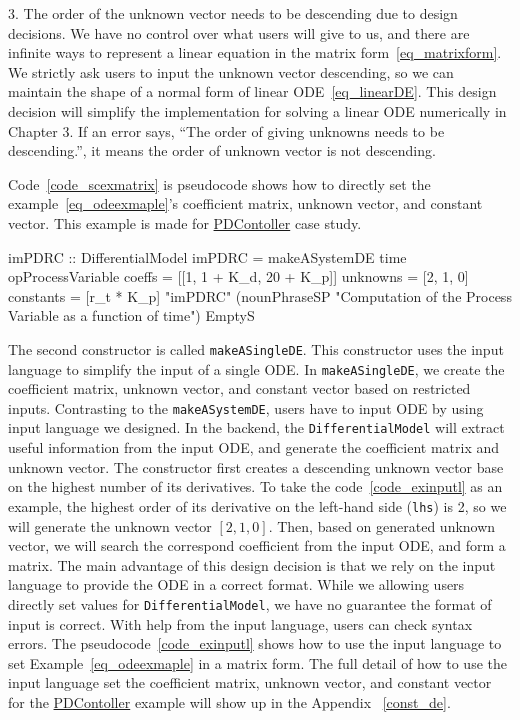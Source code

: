 3. The order of the unknown vector needs to be descending due to design decisions. We have no control over what users will give to us, and there are infinite ways to represent a linear equation in the matrix form~\ref{eq_matrixform}. We strictly ask users to input the unknown vector descending, so we can maintain the shape of a normal form of linear ODE~\ref{eq_linearDE}. This design decision will simplify the implementation for solving a linear ODE numerically in Chapter 3. If an error says, ``The order of giving unknowns needs to be descending.'', it means the order of unknown vector is not descending.

Code~\ref{code_scexmatrix} is pseudocode shows how to directly set the example~\ref{eq_odeexmaple}'s coefficient matrix, unknown vector, and constant vector. This example is made for \href{https://jacquescarette.github.io/Drasil/examples/pdcontroller/SRS/srs/PDController_SRS.html}{PDContoller} case study.

\begin{listing}[ht]
\begin{haskell1}
imPDRC :: DifferentialModel
imPDRC = makeASystemDE
	time
	opProcessVariable
	coeffs = [[1, 1 + K_d, 20 + K_p]]
	unknowns = [2, 1, 0]
	constants = [r_t * K_p]
	"imPDRC"
	(nounPhraseSP "Computation of the Process Variable as a function of time")
	EmptyS
\end{haskell1}
\label{code_scexmatrix}
\end{listing}

The second constructor is called \verb|makeASingleDE|. This constructor uses the input language to simplify the input of a single ODE. In \verb|makeASingleDE|, we create the coefficient matrix, unknown vector, and constant vector based on restricted inputs. Contrasting to the \verb|makeASystemDE|, users have to input ODE by using input language we designed. In the backend, the \verb|DifferentialModel| will extract useful information from the input ODE, and generate the coefficient matrix and unknown vector. The constructor first creates a descending unknown vector base on the highest number of its derivatives. To take the code~\ref{code_exinputl} as an example, the highest order of its derivative on the left-hand side (\verb|lhs|) is 2, so we will generate the unknown vector $[2, 1, 0]$. Then, based on generated unknown vector, we will search the correspond coefficient from the input ODE, and form a matrix. The main advantage of this design decision is that we rely on the input language to provide the ODE in a correct format. While we allowing users directly set values for \verb|DifferentialModel|, we have no guarantee the format of input is correct. With help from the input language, users can check syntax errors. The pseudocode~\ref{code_exinputl} shows how to use the input language to set Example~\ref{eq_odeexmaple} in a matrix form. The full detail of how to use the input language set the coefficient matrix, unknown vector, and constant vector for the \href{https://jacquescarette.github.io/Drasil/examples/pdcontroller/SRS/srs/PDController_SRS.html}{PDContoller} example will show up in the Appendix ~\ref{const_de}.

